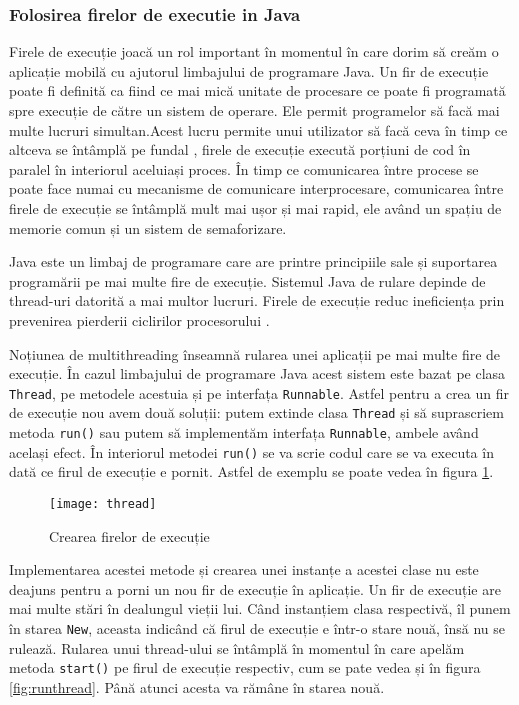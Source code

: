 \documentclass[../IoMusT.tex]{subfiles}
\begin{document}
\subsubsection{Folosirea firelor de executie in Java}
Firele de execuție joacă un rol important în momentul în care dorim să creăm o aplicație mobilă cu ajutorul limbajului de programare Java. Un fir de execuție poate fi definită ca fiind ce mai mică  unitate de procesare ce poate fi programată spre execuție de către un sistem de operare. Ele permit programelor să facă mai multe lucruri simultan.Acest lucru permite unui utilizator să facă ceva în timp ce altceva se întâmplă pe fundal \cite{articleThread}, firele de execuție execută porțiuni de cod  în paralel în interiorul aceluiași proces. În timp ce comunicarea între procese se poate face numai cu mecanisme de comunicare interprocesare, comunicarea între firele de execuție se întâmplă mult mai ușor și mai rapid, ele având un spațiu de memorie comun și un sistem de semaforizare.
\\
\par Java este un limbaj de programare care are printre principiile sale și suportarea programării pe mai multe fire de execuție. Sistemul Java de rulare depinde de thread-uri datorită a mai multor lucruri. Firele de execuție reduc ineficiența prin prevenirea pierderii ciclirilor  procesorului \cite{Thread}.
\\ 
\par Noțiunea de multithreading înseamnă rularea unei aplicații pe mai multe fire de execuție. În cazul limbajului de programare Java acest sistem este bazat pe clasa \verb|Thread|, pe metodele acestuia și pe interfața \verb|Runnable|. Astfel pentru a crea un fir de execuție nou avem două soluții: putem extinde clasa \verb|Thread| și să suprascriem metoda \verb|run()| sau putem să implementăm interfața \verb|Runnable|, ambele având același efect. În interiorul metodei \verb|run()| se va scrie codul care se va executa în dată ce firul de execuție e pornit. Astfel de exemplu se poate vedea în figura \ref{fig:thread}.
\begin{figure}[h]
\centering
\texttt{[image: thread]}
\caption{Crearea firelor de execuție}
\label{fig:thread}
\end{figure}
Implementarea acestei metode și crearea unei instanțe a acestei clase nu este deajuns pentru a porni un nou fir de execuție în aplicație. Un fir de execuție are mai multe stări în dealungul vieții lui. Când instanțiem clasa respectivă, îl punem în starea \verb|New|, aceasta indicând că firul de execuție e într-o stare nouă, însă nu se rulează. Rularea unui thread-ului se întâmplă în momentul în care apelăm metoda \verb|start()| pe firul de execuție respectiv, cum se pate vedea și în figura \ref{fig:runthread}. Până atunci acesta va rămâne în starea nouă.
\end{document}
